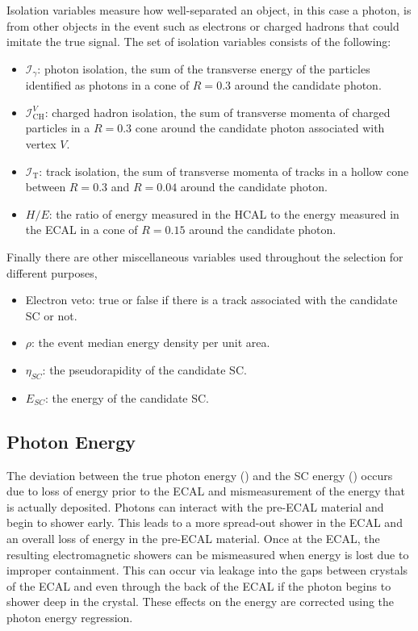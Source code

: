 Isolation variables measure how well-separated an object, in this case a photon, is from other objects in the event such as electrons or charged hadrons that could imitate the true signal. The set of isolation variables consists of the following:
\begin{itemize}[noitemsep]
    \item $\mathcal{I}_{\gamma}$: photon isolation, the sum of the transverse energy of the particles identified as photons in a cone of $R=0.3$ around the candidate photon.
    \item $\mathcal{I}^{V}_{\mathrm{CH}}$: charged hadron isolation, the sum of transverse momenta of charged particles in a $R=0.3$ cone around the candidate photon associated with vertex $V$. 
    \item $\mathcal{I}_{\mathrm{T}}$: track isolation, the sum of transverse momenta of tracks in a hollow cone between $R=0.3$ and $R=0.04$ around the candidate photon.
    \item $H/E$: the ratio of energy measured in the HCAL to the energy measured in the ECAL in a cone of $R=0.15$ around the candidate photon.
\end{itemize}

Finally there are other miscellaneous variables used throughout the selection for different purposes,
\begin{itemize}[noitemsep]
    \item Electron veto: true or false if there is a track associated with the candidate SC or not.
    \item $\rho$: the event median energy density per unit area.
    \item $\eta_{SC}$: the pseudorapidity of the candidate SC.
    \item $E_{SC}$: the energy of the candidate SC.
\end{itemize}



\subsection{Photon Energy} 
The deviation between the true photon energy (\Etrue) and the SC energy (\Eraw) occurs due to loss of energy prior to the ECAL and mismeasurement of the energy that is actually deposited.
Photons can interact with the pre-ECAL material and begin to shower early. This leads to a more spread-out shower in the ECAL and an overall loss of energy in the pre-ECAL material. 
Once at the ECAL, the resulting electromagnetic showers can be mismeasured when energy is lost due to improper containment. 
This can occur via leakage into the gaps between crystals of the ECAL and even through the back of the ECAL if the photon begins to shower deep in the crystal. 
These effects on the energy are corrected using the photon energy regression. 

